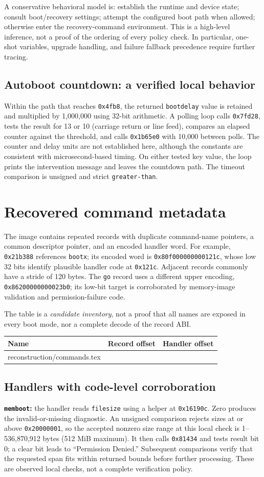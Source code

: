 \documentclass[11pt]{article}
\makeatletter
\newcommand{\tableinput}[1]{\@@input #1 }
\newcommand{\off}[1]{\texttt{0x#1}}
\makeatother
\begin{document}
A conservative behavioral model is: establish the runtime and device state;
consult boot/recovery settings; attempt the configured boot path when allowed;
otherwise enter the recovery-command environment. This is a high-level
inference, not a proof of the ordering of every policy check. In particular,
one-shot variables, upgrade handling, and failure fallback precedence require
further tracing.

\subsection{Autoboot countdown: a verified local behavior}
Within the path that reaches \off{4fb8}, the returned \texttt{bootdelay}
value is retained and multiplied by 1,000,000 using 32-bit arithmetic.
A polling loop calls \off{7fd28}, tests the result for 13 or 10
(carriage return or line feed), compares an elapsed counter against the
threshold, and calls \off{1b65e0} with 10,000 between polls.
The counter and delay units are not established here, although the constants
are consistent with microsecond-based timing. On either tested key value,
the loop prints the intervention message and leaves the countdown path.
The timeout comparison is unsigned and strict \texttt{greater-than}.

\section{Recovered command metadata}
The image contains repeated records with duplicate command-name pointers,
a common descriptor pointer, and an encoded handler word. For example,
\off{21b388} references \texttt{bootx}; its encoded word is
\texttt{0x80f000000000121c}, whose low 32 bits identify plausible handler
code at \off{121c}. Adjacent records commonly have a stride of 120 bytes.
The \texttt{go} record uses a different upper encoding,
\texttt{0x86200000000023b0}; its low-bit target is corroborated by memory-image
validation and permission-failure code.

The table is a \emph{candidate inventory}, not a proof that all names are
exposed in every boot mode, nor a complete decode of the record ABI.
\begin{longtable}{@{}lll@{}}
\toprule
Name & Record offset & Handler offset \\
\midrule\endhead
\tableinput{reconstruction/commands.tex}
\bottomrule
\end{longtable}

\subsection{Handlers with code-level corroboration}
\textbf{\texttt{memboot}:} the handler reads \texttt{filesize} using a helper
at \off{16190c}. Zero produces the invalid-or-missing diagnostic.
An unsigned comparison rejects sizes at or above \off{20000001}, so the
accepted nonzero size range at this local check is 1--536,870,912 bytes
(512 MiB maximum). It then calls \off{81434} and tests result bit 0;
a clear bit leads to ``Permission Denied.'' Subsequent comparisons verify
that the requested span fits within returned bounds before further processing.
These are observed local checks, not a complete verification policy.
\end{document}
